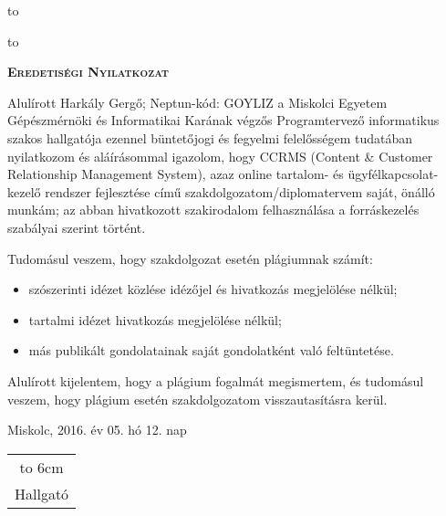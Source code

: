 
\vskip 2cm

\hbox to 

\hbox to 

\newpage

\vspace*{1cm}  
\begin{center}
\large\textsc{\bfseries Eredetiségi Nyilatkozat}
\end{center}
\vspace*{2cm}  

Alulírott Harkály Gergő; Neptun-kód: GOYLIZ a Miskolci Egyetem Gépészmérnöki és Informatikai Karának végzős Programtervező informatikus szakos hallgatója ezennel büntetőjogi és fegyelmi felelősségem tudatában nyilatkozom és aláírásommal igazolom, hogy CCRMS (Content \& Customer Relationship Management System), azaz online tartalom- és ügyfélkapcsolat-kezelő rendszer fejlesztése című szakdolgozatom/diplomatervem saját, önálló munkám; az abban hivatkozott szakirodalom felhasználása a forráskezelés szabályai szerint történt.

Tudomásul veszem, hogy szakdolgozat esetén plágiumnak számít:
\begin{itemize}
	\item szószerinti idézet közlése idézőjel és hivatkozás megjelölése nélkül;
	\item tartalmi idézet hivatkozás megjelölése nélkül;
	\item más publikált gondolatainak saját gondolatként való feltüntetése.
\end{itemize}

Alulírott kijelentem, hogy a plágium fogalmát megismertem, és tudomásul veszem, hogy plágium esetén szakdolgozatom visszautasításra kerül.

\vspace*{3cm}

\noindent Miskolc, 2016. év  05. hó 12. nap

\vspace*{3cm}

\hspace*{8cm}\begin{tabular}{c}
\hbox to 6cm{\dotfill}\\
Hallgató
\end{tabular}

\newpage

